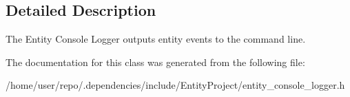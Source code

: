 \subsection{Detailed Description}
The Entity Console Logger outputs entity events to the command line. 

The documentation for this class was generated from the following file\+:\begin{DoxyCompactItemize}
\item 
/home/user/repo/.\+dependencies/include/\+Entity\+Project/entity\+\_\+console\+\_\+logger.\+h\end{DoxyCompactItemize}

